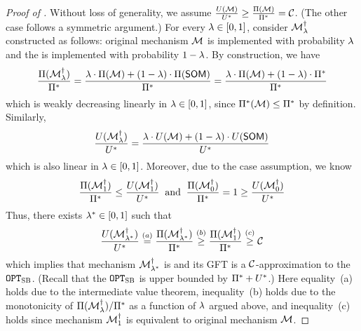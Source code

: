 \begin{proof}[Proof of ]
    Without loss of generality, we assume $\frac{\buyerexanteutil(\mech)}{\buyerbenchmark} \geq \frac{\sellerexanteutil(\mech)}{\sellerbenchmark} = %
    \GFTapprox$. (The other case follows a symmetric argument.)
    For every $\lambda\in[0, 1]$, consider $\mathcal{M}^\dagger_{\lambda}$ constructed as follows: original mechanism $\mathcal{M}$ is implemented with probability $\lambda$ and the {\SellerOffer} is implemented with probability $1-\lambda$. By construction, we have
    \begin{align*}
        \frac{\Pi(\mathcal{M}^\dagger_\lambda)}{\Pi^*} 
        =
        \frac{\lambda\cdot \Pi(\mathcal{M}) + (1-\lambda)\cdot \Pi({\sf SOM})}{\Pi^*} 
        =
        \frac{\lambda\cdot \Pi(\mathcal{M}) + (1-\lambda)\cdot \Pi^*}{\Pi^*} 
    \end{align*}
    which is weakly decreasing linearly in $\lambda\in[0, 1]$, since $\Pi^*(\mathcal{M}) \leq \Pi^*$ by definition. Similarly, 
    \begin{align*}
        \frac{U(\mathcal{M}^\dagger_\lambda)}{U^*} 
        =
        \frac{\lambda\cdot U(\mathcal{M}) + (1-\lambda)\cdot U({\sf SOM})}{U^*} 
    \end{align*}
    which is also linear in $\lambda\in[0, 1]$. Moreover, due to the case assumption, we know 
    \begin{align*}
        \frac{\Pi(\mathcal{M}^\dagger_1)}{\Pi^*} 
        \leq 
        \frac{U(\mathcal{M}^\dagger_1)}{U^*}
        \;\;
        \mbox{and}
        \;\;
        \frac{\Pi(\mathcal{M}^\dagger_0)}{\Pi^*} = 1
        \geq 
        \frac{U(\mathcal{M}^\dagger_0)}{U^*}
    \end{align*}
    Thus, there exists $\lambda^*\in[0, 1]$ such that 
    \begin{align*}
        \frac{U(\mathcal{M}^\dagger_{\lambda^*})}{U^*} 
        \overset{(a)}{=} 
        \frac{\Pi(\mathcal{M}^\dagger_{\lambda^*})}{\Pi^*} 
        \overset{(b)}{\geq}
        \frac{\Pi(\mathcal{M}^\dagger_{1})}{\Pi^*} 
        \overset{(c)}{\geq}
        \mathcal{C}
    \end{align*}
    which implies that mechanism $\mathcal{M}^\dagger_{\lambda^*}$ is {\ksfair} and its GFT is a $\mathcal{C}$-approximation to the {\SecondBest} $\texttt{OPT}_{\textsc{SB}}$. (Recall that the {\SecondBest} $\texttt{OPT}_{\textsc{SB}}$ is upper bounded by $\Pi^* + U^*$.) Here equality~(a) holds due to the intermediate value theorem, inequality~(b) holds due to the monotonicity of $
    {\Pi(\mathcal{M}^\dagger_{\lambda})}/{\Pi^*}$ as a function of $\lambda$ argued above,
    and 
    inequality~(c) holds since mechanism $\mathcal{M}^\dagger_1$ is equivalent to original mechanism $\mathcal{M}$.
\end{proof}



